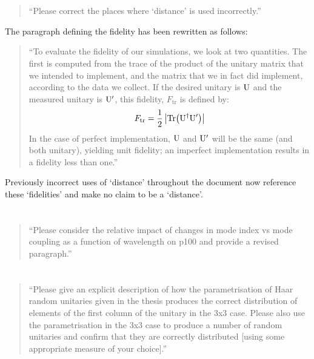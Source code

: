 \documentclass[a4paper,11pt]{article}
\begin{document}
\section{}
\begin{quote}
  ``Please correct the places where `distance' is used incorrectly.''
\end{quote}
The paragraph defining the fidelity has been rewritten as follows:
\begin{quote}
  ``To evaluate the fidelity of our simulations, we look at two quantities. The
  first is computed from the trace of the product of the unitary matrix that we
  intended to implement, and the matrix that we in fact did implement, according
  to the data we collect. If the desired unitary is \(\mathrm{U}\) and
  the measured unitary is \(\mathrm{U^{\prime}}\), this fidelity,
  \(F_{\mathrm{tr}}\) is defined by:
  \begin{equation}
    F_{\mathrm{tr}}=\frac{1}{2}\left|\mathrm{Tr}\!\left(\mathrm{U}^{\dagger}{\mathrm{U}^{\prime}}\right)\right|
  \end{equation}
  In the case of perfect implementation, \(\mathrm{U}\) and \(\mathrm{U^{\prime}}\)
  will be the same (and both unitary), yielding unit fidelity; an imperfect
  implementation results in a fidelity less than one.''
\end{quote}
Previously incorrect uses of `distance' throughout the document now reference
these `fidelities' and make no claim to be a `distance'.

\section{}
\begin{quote}
  ``Please consider the relative impact of changes in mode index vs
  mode coupling as a function of wavelength on p100 and provide a
  revised paragraph.''
\end{quote}

\section{}
\begin{quote}
  ``Please give an explicit description of how the parametrisation of
  Haar random unitaries given in the thesis produces the correct
  distribution of elements of the first column of the unitary in the 3x3
  case.  Please also use the parametrisation in the 3x3 case to produce
  a number of random unitaries and confirm that they are correctly
  distributed [using some appropriate measure of your choice].''
\end{quote}
\end{document}
